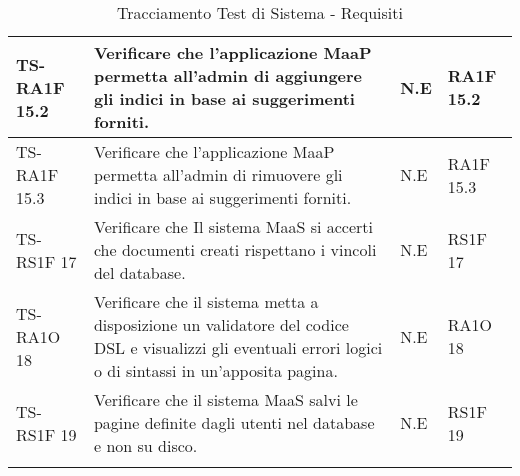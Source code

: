 \begin{center}
\begin{longtable}{| p{3cm} | p{6cm} | p{1.5cm} | p{2cm} | }
        TS-RA1F 15.2 & 
        Verificare che l’applicazione MaaP permetta all’admin di aggiungere gli indici in base ai suggerimenti forniti. & N.E &       
            RA1F 15.2 \newline  \\ \hline 
        TS-RA1F 15.3 & 
        Verificare che l’applicazione MaaP permetta all’admin di rimuovere gli indici in base ai suggerimenti forniti. & N.E &       
            RA1F 15.3 \newline  \\ \hline 
        TS-RS1F 17 & 
        Verificare che Il sistema MaaS si accerti che documenti creati rispettano i vincoli del database. & N.E &       
            RS1F 17 \newline  \\ \hline 
        TS-RA1O 18 & 
        Verificare che il sistema metta a disposizione un validatore del codice DSL e visualizzi gli eventuali errori logici o di sintassi in un'apposita pagina. & N.E &       
            RA1O 18 \newline  \\ \hline 
        TS-RS1F 19 & 
        Verificare che il sistema MaaS salvi le pagine definite dagli utenti nel database e non su disco. & N.E &       
            RS1F 19 \newline  \\ \hline 
    \caption{Tracciamento Test di Sistema - Requisiti}
    \end{longtable}
   \egroup
\end{center}